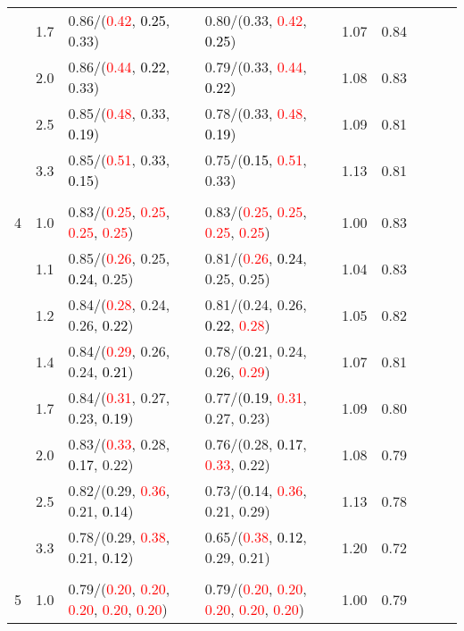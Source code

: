 \documentclass[10pt,a4paper]{report}
\begin{document}
\begin{table}[!htbp]
\begin{center}
{\begin{tabular}{ccllccccc}
			&1.7&0.86/(\textcolor{red}{0.42}, \textcolor{black}{0.25}, 0.33)&0.80/(0.33, \textcolor{red}{0.42}, \textcolor{black}{0.25})&1.07&0.84\\
			&2.0&0.86/(\textcolor{red}{0.44}, \textcolor{black}{0.22}, 0.33)&0.79/(0.33, \textcolor{red}{0.44}, \textcolor{black}{0.22})&1.08&0.83\\
			&2.5&0.85/(\textcolor{red}{0.48}, 0.33, \textcolor{black}{0.19})&0.78/(0.33, \textcolor{red}{0.48}, \textcolor{black}{0.19})&1.09&0.81\\
			&3.3&0.85/(\textcolor{red}{0.51}, 0.33, \textcolor{black}{0.15})&0.75/(\textcolor{black}{0.15}, \textcolor{red}{0.51}, 0.33)&1.13&0.81\\
			&&&&\\
			4			&1.0&0.83/(\textcolor{red}{0.25}, \textcolor{red}{0.25}, \textcolor{red}{0.25}, \textcolor{red}{0.25})&0.83/(\textcolor{red}{0.25}, \textcolor{red}{0.25}, \textcolor{red}{0.25}, \textcolor{red}{0.25})&1.00&0.83\\
			&1.1&0.85/(\textcolor{red}{0.26}, 0.25, \textcolor{black}{0.24}, 0.25)&0.81/(\textcolor{red}{0.26}, \textcolor{black}{0.24}, 0.25, 0.25)&1.04&0.83\\
			&1.2&0.84/(\textcolor{red}{0.28}, 0.24, 0.26, \textcolor{black}{0.22})&0.81/(0.24, 0.26, \textcolor{black}{0.22}, \textcolor{red}{0.28})&1.05&0.82\\
			&1.4&0.84/(\textcolor{red}{0.29}, 0.26, 0.24, \textcolor{black}{0.21})&0.78/(\textcolor{black}{0.21}, 0.24, 0.26, \textcolor{red}{0.29})&1.07&0.81\\
			&1.7&0.84/(\textcolor{red}{0.31}, 0.27, 0.23, \textcolor{black}{0.19})&0.77/(\textcolor{black}{0.19}, \textcolor{red}{0.31}, 0.27, 0.23)&1.09&0.80\\
			&2.0&0.83/(\textcolor{red}{0.33}, 0.28, \textcolor{black}{0.17}, 0.22)&0.76/(0.28, \textcolor{black}{0.17}, \textcolor{red}{0.33}, 0.22)&1.08&0.79\\
			&2.5&0.82/(0.29, \textcolor{red}{0.36}, 0.21, \textcolor{black}{0.14})&0.73/(\textcolor{black}{0.14}, \textcolor{red}{0.36}, 0.21, 0.29)&1.13&0.78\\
			&3.3&0.78/(0.29, \textcolor{red}{0.38}, 0.21, \textcolor{black}{0.12})&0.65/(\textcolor{red}{0.38}, \textcolor{black}{0.12}, 0.29, 0.21)&1.20&0.72\\
			&&&&\\
			5			&1.0&0.79/(\textcolor{red}{0.20}, \textcolor{red}{0.20}, \textcolor{red}{0.20}, \textcolor{red}{0.20}, \textcolor{red}{0.20})&0.79/(\textcolor{red}{0.20}, \textcolor{red}{0.20}, \textcolor{red}{0.20}, \textcolor{red}{0.20}, \textcolor{red}{0.20})&1.00&0.79\\

\end{tabular}}
\end{center}
\end{table}
\end{document}
